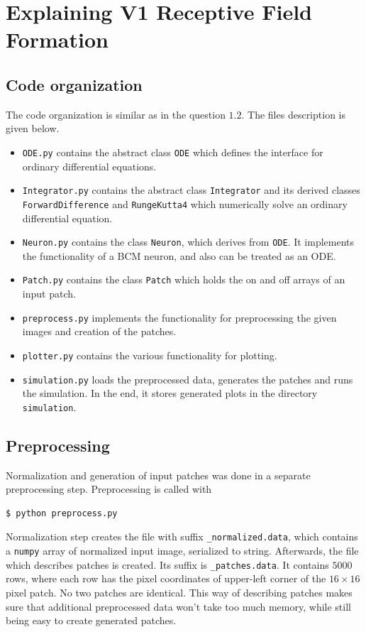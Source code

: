 \clearpage
\section{Explaining V1 Receptive Field Formation}

\subsection{Code organization}

The code organization is similar as in the question $1.2$. The files description
is given below.
\begin{itemize}
    \item \texttt{ODE.py} contains the abstract class \texttt{ODE} which defines
        the interface for ordinary differential equations.
    \item \texttt{Integrator.py} contains the abstract class \texttt{Integrator}
        and its derived classes \texttt{ForwardDifference} and
        \texttt{RungeKutta4} which numerically solve an ordinary differential
        equation.
    \item \texttt{Neuron.py} contains the class \texttt{Neuron}, which derives
        from \texttt{ODE}. It implements the functionality of a BCM neuron, and
        also can be treated as an ODE.
    \item \texttt{Patch.py} contains the class \texttt{Patch} which holds the
        on and off arrays of an input patch.
    \item \texttt{preprocess.py} implements the functionality for preprocessing
        the given images and creation of the patches.
    \item \texttt{plotter.py} contains the various functionality for plotting.
    \item \texttt{simulation.py} loads the preprocessed data, generates the
        patches and runs the simulation. In the end, it stores generated plots
        in the directory \texttt{simulation}.
\end{itemize}

\subsection{Preprocessing}
Normalization and generation of input patches was done in a separate
preprocessing step. Preprocessing is called with
\begin{lstlisting}[language=bash]
$ python preprocess.py
\end{lstlisting}
Normalization step creates the file with suffix \texttt{\_normalized.data},
which contains a \texttt{numpy} array of normalized input image, serialized to
string. Afterwards, the file which describes patches is created. Its suffix is
\texttt{\_patches.data}. It contains $5000$ rows, where each row has the pixel
coordinates of upper-left corner of the $16\times16$ pixel patch. No two
patches are identical. This way of describing patches makes sure that additional
preprocessed data won't take too much memory, while still being easy to create
generated patches.

